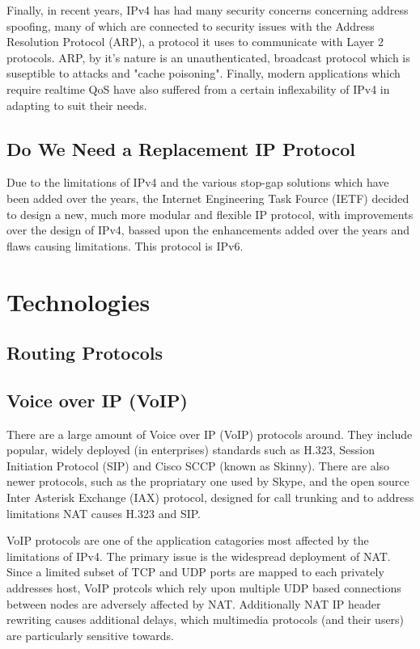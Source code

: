 \documentclass[a4paper,12pt]{article}
\begin{document}
Finally, in recent years, IPv4 has had many security concerns concerning
address spoofing, many of which are connected to security issues with
the Address Resolution Protocol (ARP), a protocol it uses to communicate
with Layer 2 protocols. ARP, by it's nature is an unauthenticated, 
broadcast protocol which is suseptible to attacks and "cache poisoning".
Finally, modern applications which require realtime QoS have also 
suffered from a certain inflexability of IPv4 in adapting to suit their 
needs.

\subsection{Do We Need a Replacement IP Protocol}

Due to the limitations of IPv4 and the various stop-gap solutions which
have been added over the years, the Internet Engineering Task Fource
(IETF) decided to design a new, much more modular and flexible IP
protocol, with improvements over the design of IPv4, bassed upon the
enhancements added over the years and flaws causing limitations. This
protocol is IPv6.

\section{Technologies}

\subsection{Routing Protocols}


\subsection{Voice over IP (VoIP)}

There are a large amount of Voice over IP (VoIP) protocols around. They
include popular, widely deployed (in enterprises) standards such as 
H.323, Session Initiation Protocol (SIP) and Cisco SCCP (known as
Skinny). There are also newer protocols, such as the propriatary one used
by Skype, and the open source Inter Asterisk Exchange (IAX) protocol,
designed for call trunking and to address limitations NAT causes H.323
and SIP.


VoIP protocols are one of the application catagories most affected by
the limitations of IPv4. The primary issue is the widespread deployment
of NAT. Since a limited subset of TCP and UDP ports are mapped to each
privately addresses host, VoIP protcols which rely upon multiple UDP
based connections between nodes are adversely affected by NAT.
Additionally NAT IP header rewriting causes additional delays, which 
multimedia protocols (and their users) are particularly sensitive 
towards.
\end{document}
